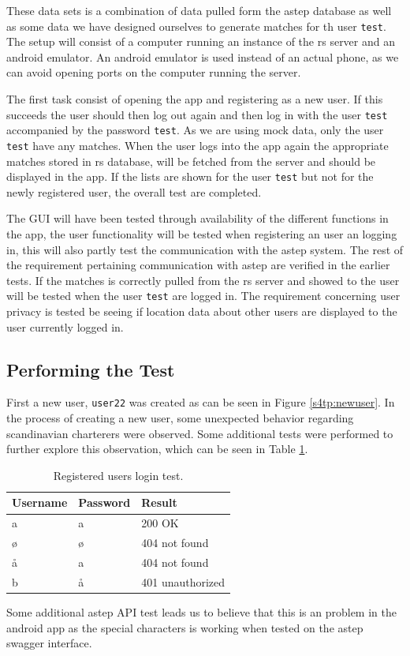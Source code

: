These data sets is a combination of data pulled form the \gls{astep} database as well as some data we have designed ourselves to generate matches for th user \texttt{test}.
The setup will consist of a computer running an instance of the \gls{rs} server and an android emulator.
An android emulator is used instead of an actual phone, as we can avoid opening ports on the computer running the server.

The first task consist of opening the app and registering as a new user. 
If this succeeds the user should then log out again and then log in with the user \texttt{test} accompanied by the password \texttt{test}.
As we are using mock data, only the user \texttt{test} have any matches.
When the user logs into the app again the appropriate matches stored in \gls{rs} database, will be fetched from the server and should be displayed in the app.
If the lists are shown for the user \texttt{test} but not for the newly registered user, the overall test are completed. 

The GUI will have been tested through availability of the different functions in the app, the user functionality will be tested when registering an user an logging in, this will also partly test the communication with the \gls{astep} system.
The rest of the requirement pertaining communication with \gls{astep} are verified in the earlier tests.
If the matches is correctly pulled from the \gls{rs} server and showed to the user will be tested when the user \texttt{test} are logged in.
The requirement concerning user privacy is tested be seeing if location data about other users are displayed to the user currently logged in. 


\subsection{Performing the Test}
First a new user, \texttt{user22} was created as can be seen in Figure \ref{s4tp:newuser}.
In the process of creating a new user, some unexpected behavior regarding scandinavian charterers were observed.
Some additional tests were performed to further explore this observation, which can be seen in Table \ref{tab:logintest}.
\begin{table}[!ht]
	\centering
	\begin{tabular}{@{}lll@{}}
		Username & Password & Result \\
		\hline
		a & a & 200 OK\\
		ø & ø & 404 not found\\
		å & a & 404 not found\\
		b & å & 401 unauthorized\\
	\end{tabular}
	\caption{Registered users login test.}
	\label{tab:logintest}
\end{table}
Some additional \gls{astep} API test leads us to believe that this is an problem in the android app as the special characters is working when tested on the \gls{astep} swagger interface.

